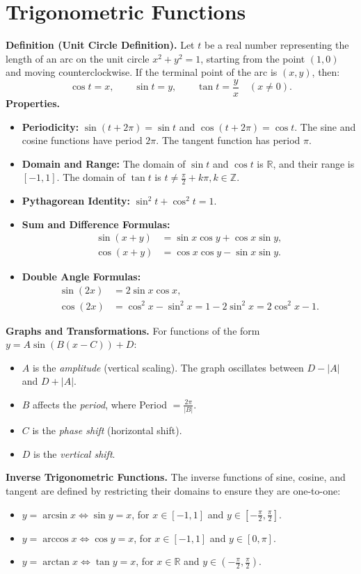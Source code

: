 \documentclass[11pt,a4paper]{article}
\begin{document}
\section{Trigonometric Functions}
\textbf{Definition (Unit Circle Definition).} Let $t$ be a real number representing the length of an arc on the unit circle $x^2 + y^2 = 1$, starting from the point $(1, 0)$ and moving counterclockwise. If the terminal point of the arc is $(x, y)$, then:
\begin{equation*}
\cos t = x, \qquad \sin t = y, \qquad \tan t = \frac{y}{x} \quad (x \neq 0).
\end{equation*}
\textbf{Properties.}
\begin{itemize}
\item \textbf{Periodicity:} $\sin(t + 2\pi) = \sin t$ and $\cos(t + 2\pi) = \cos t$. The sine and cosine functions have period $2\pi$. The tangent function has period $\pi$.
\item \textbf{Domain and Range:} The domain of $\sin t$ and $\cos t$ is $\mathbb{R}$, and their range is $[-1, 1]$. The domain of $\tan t$ is $t \neq \frac{\pi}{2} + k\pi, k \in \mathbb{Z}$.
\item \textbf{Pythagorean Identity:} $\sin^2 t + \cos^2 t = 1$.
\item \textbf{Sum and Difference Formulas:}
\begin{align*}
\sin(x + y) &= \sin x \cos y + \cos x \sin y, \\
\cos(x + y) &= \cos x \cos y - \sin x \sin y.
\end{align*}
\item \textbf{Double Angle Formulas:}
\begin{align*}
\sin(2x) &= 2 \sin x \cos x, \\
\cos(2x) &= \cos^2 x - \sin^2 x = 1 - 2\sin^2 x = 2\cos^2 x - 1.
\end{align*}
\end{itemize}
\textbf{Graphs and Transformations.} For functions of the form $y = A \sin(B(x - C)) + D$:
\begin{itemize}
\item $A$ is the \textit{amplitude} (vertical scaling). The graph oscillates between $D - |A|$ and $D + |A|$.
\item $B$ affects the \textit{period}, where Period $= \frac{2\pi}{|B|}$.
\item $C$ is the \textit{phase shift} (horizontal shift).
\item $D$ is the \textit{vertical shift}.
\end{itemize}
\textbf{Inverse Trigonometric Functions.} The inverse functions of sine, cosine, and tangent are defined by restricting their domains to ensure they are one-to-one:
\begin{itemize}
\item $y = \arcsin x \iff \sin y = x$, for $x \in [-1, 1]$ and $y \in [-\frac{\pi}{2}, \frac{\pi}{2}]$.
\item $y = \arccos x \iff \cos y = x$, for $x \in [-1, 1]$ and $y \in [0, \pi]$.
\item $y = \arctan x \iff \tan y = x$, for $x \in \mathbb{R}$ and $y \in (-\frac{\pi}{2}, \frac{\pi}{2})$.
\end{itemize}
\end{document}
